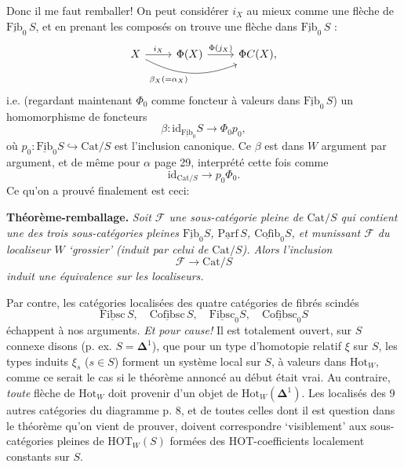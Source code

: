 \documentclass[11pt]{article}
\newcommand{\msp}[1]{\marginpar{\footnotesize [#1]}}
\newcommand{\uu}[1]{\underline{\mathrm{#1}}}
\begin{document}
\msp{page 31}
Donc il me faut remballer! On peut considérer $i_X$ au mieux comme une flèche de $\uu{Fib}_0\, S$, et en prenant les composés on trouve une flèche dans $\uu{Fib}_0\, S$ :
\[
\begin{tikzcd}
X \arrow[r, "i_X"] \arrow[rr, bend right=25, "\beta_X(=\alpha_X)"'] & \Phi(X) \arrow[r, "\Phi(j_X)"] & \Phi C(X),
\end{tikzcd}
\]
i.e. (regardant maintenant $\Phi_0$ comme foncteur à valeurs dans $\uu{Fib}_0\, S$) un homomorphisme de foncteurs
\[
\beta : \mathrm{id}_{\uu{Fib}_0} S \longrightarrow \Phi_0 p_0, %
\]
où $p_0 : \uu{Fib}_0 S \hookrightarrow \mathrm{Cat}/S$ est l'inclusion canonique. Ce $\beta$ est dans $W$ argument par argument, et de même pour $\alpha$ page 29, interprété cette fois comme
\[
\mathrm{id}_{\mathrm{Cat}/S} \longrightarrow p_0\Phi_0.
\]
Ce qu'on a prouvé finalement est ceci:

\textbf{Théorème-remballage.} \textit{Soit $\mathcal{F}$ une sous-catégorie pleine de $\mathrm{Cat}/S$ qui contient une des trois sous-catégories pleines $\uu{Fib}_0 S$, $\uu{Parf}\, S$, $\uu{Cofib}_0 S$, et munissant $\mathcal{F}$ du localiseur $W$ `grossier' (induit par celui de $\mathrm{Cat}/S$). Alors l'inclusion}
\[
\mathcal{F} \longrightarrow \mathrm{Cat}/S
\]
\textit{induit une équivalence sur les localiseurs.}

\msp{page 32}
Par contre, les catégories localisées des quatre catégories de fibrés scindés
\[
\uu{Fibsc}\, S, \quad \uu{Cofibsc}\, S, \quad \uu{Fibsc}_0 S, \quad \uu{Cofibsc}_0 S
\]
échappent à nos arguments. \textit{Et pour cause!} Il est totalement ouvert, sur $S$ connexe disons (p. ex. $S = \mathbf{\Delta}^1$), que pour un type d'homotopie relatif $\xi$ sur $S$, les types induits $\xi_s$ ($s \in S$) forment un système local sur $S$, à valeurs dans $\mathrm{Hot}_W$, comme ce serait le cas si le théorème annoncé au début était vrai. Au contraire, \textit{toute} flèche de $\mathrm{Hot}_W$ doit provenir d'un objet de $\mathrm{Hot}_W(\mathbf{\Delta}^1)$. Les localisés des 9 autres catégories du diagramme p. 8, et de toutes celles dont il est question dans le théorème qu'on vient de prouver, doivent correspondre `visiblement' aux sous-catégories pleines de $\mathrm{HOT}_W(S)$ formées des HOT-coefficients localement constants sur $S$.
\end{document}
